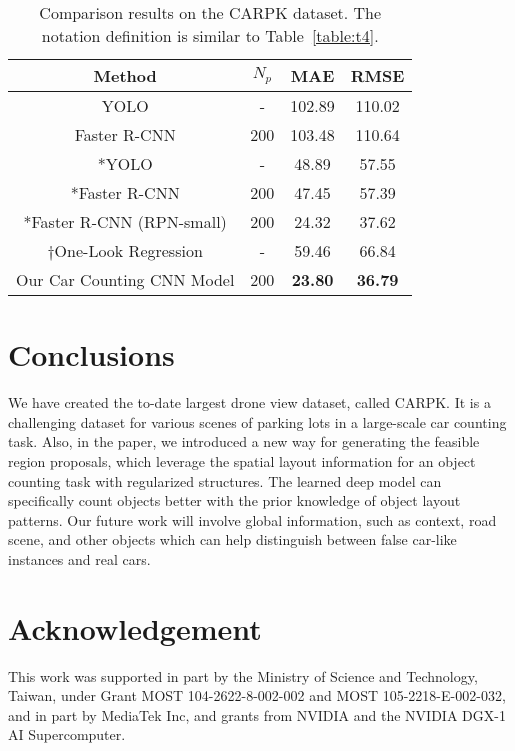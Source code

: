 \documentclass[10pt,twocolumn,letterpaper]{article}
\begin{document}
\begin{table}[h]
	\caption{Comparison results on the CARPK dataset. The notation definition is similar to Table~\ref{table:t4}.}
	\vspace{-0.5 cm}
\begin{center}
\begin{tabular}{|c|c|c|c|}
\hline

Method & $N_{p}$ & MAE  & RMSE \\
\hline\hline
YOLO \cite{43_redmon2016you}		  & - & 102.89 & 110.02 \\
\hline
Faster R-CNN \cite{21_ren2015faster}  & 200 & 103.48 & 110.64 \\
\hline\hline
*YOLO 		 						  & - & 48.89 & 57.55 \\
\hline
*Faster R-CNN  						  & 200 & 47.45 & 57.39 \\
\hline
*Faster R-CNN (RPN-small)  			  & 200 & 24.32 &  37.62\\
\hline
$\dagger$One-Look Regression \cite{04_mundhenk2016large}  & - & 59.46 & 66.84 \\
\hline
Our Car Counting CNN Model 			  & 200 & \textbf{23.80} & \textbf{36.79} \\
\hline
\end{tabular}
\end{center}
\label{table:t5}
\end{table}
\vspace{-0.5 cm}

\section{Conclusions}
We have created the to-date largest drone view dataset, called CARPK. It is a challenging dataset for various scenes of parking lots in a large-scale car counting task. Also, in the paper, we introduced a new way for generating the feasible region proposals, which leverage the spatial layout information for an object counting task with regularized structures. The learned deep model can specifically count objects better with the prior knowledge of object layout patterns. Our future work will involve global information, such as context, road scene, and other objects which can help distinguish between false car-like instances and real cars.

\section{Acknowledgement}
This work was supported in part by the Ministry of Science and Technology, Taiwan, under Grant MOST 104-2622-8-002-002 and MOST 105-2218-E-002-032, and in part by MediaTek Inc, and grants from NVIDIA and the NVIDIA DGX-1 AI Supercomputer.



{\small


}
\end{document}
